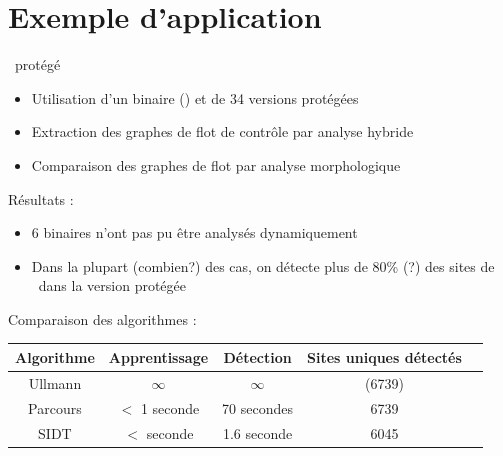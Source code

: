 \documentclass{beamer}
\begin{document}
\section{Exemple d'application}
\begin{frame}{\hostname\ protégé}
\begin{itemize}
 \item Utilisation d'un binaire (\hostname) et de 34 versions protégées
 \item Extraction des graphes de flot de contrôle par analyse hybride
 \item Comparaison des graphes de flot par analyse morphologique
\end{itemize}

\pause
Résultats :
\begin{itemize}
 \item 6 binaires n'ont pas pu être analysés dynamiquement
 \item Dans la plupart (combien?) des cas, on détecte plus de 80\% (?) des sites de \hostname\ dans la version protégée
\end{itemize}

\pause
Comparaison des algorithmes :
\begin{center}
\begin{tabular}{|c|c|c|c|c|}
\hline
 Algorithme & Apprentissage & Détection & Sites uniques détectés\\
 \hline
 Ullmann & $\infty$ & $\infty$ & (6739)\\
 Parcours & $<$ 1 seconde & 70 secondes & 6739\\
 SIDT & $<$ seconde & 1.6 seconde & 6045\\
 \hline
\end{tabular}
\end{center}

\end{frame}
\end{document}
